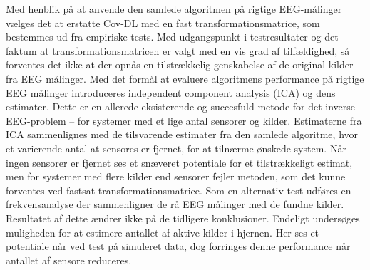Med henblik på at anvende den samlede algoritmen på rigtige EEG-målinger vælges det at erstatte Cov-DL med en fast transformationsmatrice, som bestemmes ud fra empiriske tests. 
Med udgangspunkt i testresultater og det faktum at transformationsmatricen er valgt med en vis grad af tilfældighed,  så forventes det ikke at der opnås en tilstrækkelig genskabelse af de original kilder fra EEG målinger. 
Med det formål at evaluere algoritmens performance på rigtige EEG målinger introduceres independent component analysis (ICA) og dens estimater. Dette er en allerede eksisterende og succesfuld metode for det inverse EEG-problem – for systemer med et lige antal sensorer og kilder. 
Estimaterne fra ICA sammenlignes med de tilsvarende estimater fra den samlede algoritme, hvor et varierende antal at sensores er fjernet, for at tilnærme ønskede system. Når ingen sensorer er fjernet ses et snæveret  potentiale for et tilstrækkeligt estimat, men for systemer med flere kilder end sensorer fejler metoden, som det kunne forventes ved fastsat transformationsmatrice. Som en alternativ test udføres en frekvensanalyse der sammenligner de rå EEG målinger med de fundne kilder. Resultatet af dette ændrer ikke på de tidligere konklusioner.
Endeligt undersøges muligheden for at estimere antallet af aktive kilder i hjernen. Her ses et potentiale når ved test på simuleret data, dog forringes denne performance når antallet af sensore reduceres.   
